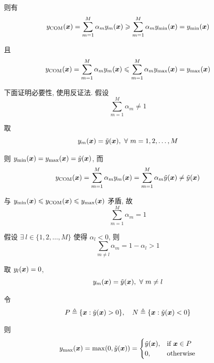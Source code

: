 \documentclass{article}
\begin{document}
则有
\begin{equation}
  y_{\text{COM}}(\bm{x})
  =\sum_{m=1}^{M}\alpha_{m}y_{m}(\bm{x})
  \geqslant\sum_{m=1}^{M}\alpha_{m}y_{\min}(\bm{x})
  =y_{\min}(\bm{x})
\end{equation}

且
\begin{equation}
  y_{\text{COM}}(\bm{x})
  =\sum_{m=1}^{M}\alpha_{m}y_{m}(\bm{x})
  \leqslant\sum_{m=1}^{M}\alpha_{m}y_{\max}(\bm{x})
  =y_{\max}(\bm{x})
\end{equation}

下面证明必要性, 使用反证法. 假设
\begin{equation}
  \sum_{m=1}^{M}\alpha_{m}\neq1
\end{equation}

取
\begin{equation}
  y_m(\bm{x})=\tilde{y}(\bm{x}),~\forall~m=1,2,\dots,M
\end{equation}

则 $y_{\min}(\bm{x})=y_{\max}(\bm{x})=\tilde{y}(\bm{x})$, 而
\begin{equation}
  y_{\text{COM}}(\bm{x})
  =\sum_{m=1}^{M}\alpha_{m}y_{m}(\bm{x})
  =\sum_{m=1}^{M}\alpha_{m}\tilde{y}(\bm{x})
  \neq\tilde{y}(\bm{x})
\end{equation}

与 $y_{\min}(\bm{x})\leqslant y_{\text{COM}}(\bm{x})\leqslant y_{\max}(\bm{x})$ 矛盾, 故
\begin{equation}
  \sum_{m=1}^{M}\alpha_{m}=1
\end{equation}

假设 $\exists~l\in\{1,2,\dots,M\}$ 使得 $\alpha_l<0$, 则
\begin{equation}
  \sum_{m\neq l}\alpha_m=1-\alpha_l>1
  \label{eq:sum_alpha}
\end{equation}

取 $y_l(\bm{x})=0$, 
\begin{equation}
  y_m(\bm{x})=\tilde{y}(\bm{x}),~\forall~m\neq l
\end{equation}

令
\begin{equation}
  P\triangleq\{\bm{x}:\tilde{y}(\bm{x})>0\},\quad
  N\triangleq\{\bm{x}:\tilde{y}(\bm{x})<0\}
\end{equation}

则
\begin{equation}
  y_{\max}(\bm{x})=\max(0,\tilde{y}(\bm{x}))
  =\begin{cases}
    \tilde{y}(\bm{x}), &\text{if}~\bm{x}\in P\\
    0, &\text{otherwise}\\
  \end{cases}
\end{equation}
\end{document}
